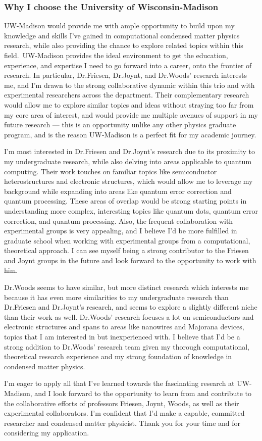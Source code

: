 \documentclass[11pt]{article}
\newcommand{\school}{University of Wisconsin-Madison}
\newcommand{\schoolabbr}{UW-Madison}
\begin{document}
\subsubsection*{Why I choose the \school{}}
\schoolabbr{} would provide me with ample opportunity to build upon my knowledge and skills I've gained in computational condensed matter physics research, while also providing the chance to explore related topics within this field.\ \schoolabbr{} provides the ideal environment to get the education, experience, and expertise I need to go forward into a career, onto the frontier of research. In particular, Dr.\@ Friesen, Dr.\@ Joynt, and Dr.\@ Woods' research interests me, and I’m drawn to the strong collaborative dynamic within this trio and with experimental researchers across the department. Their complementary research would allow me to explore similar topics and ideas without straying too far from my core area of interest, and would provide me multiple avenues of support in my future research --- this is an opportunity unlike any other physics graduate program, and is the reason \schoolabbr{} is a perfect fit for my academic journey.

I'm most interested in Dr.\@ Friesen and Dr.\@ Joynt's research due to its proximity to my undergraduate research, while also delving into areas applicable to quantum computing. Their work touches on familiar topics like semiconductor heterostructures and electronic structures, which would allow me to leverage my background while expanding into areas like quantum error correction and quantum processing. These areas of overlap would be strong starting points in understanding more complex, interesting topics like quantum dots, quantum error correction, and quantum processing. Also, the frequent collaboration with experimental groups is very appealing, and I believe I'd be more fulfilled in graduate school when working with experimental groups from a computational, theoretical approach. I can see myself being a strong contributor to the Friesen and Joynt groups in the future and look forward to the opportunity to work with him.

Dr.\@ Woods seems to have similar, but more distinct research which interests me because it has even more similarities to my undergraduate research than Dr.\@ Friesen and Dr.\@ Joynt's research, and seems to explore a slightly different niche than their work as well. Dr.\@ Woods' research focuses a lot on semiconductors and electronic structures and spans to areas like nanowires and Majorana devices, topics that I am interested in but inexperienced with. I believe that I'd be a strong addition to Dr.\@ Woods' research team given my thorough computational, theoretical research experience and my strong foundation of knowledge in condensed matter physics.

I'm eager to apply all that I've learned towards the fascinating research at \schoolabbr{}, and I look forward to the opportunity to learn from and contribute to the collaborative efforts of professors Friesen, Joynt, Woods, as well as their experimental collaborators. I'm confident that I'd make a capable, committed researcher and condensed matter physicist. Thank you for your time and for considering my application.
\end{document}
